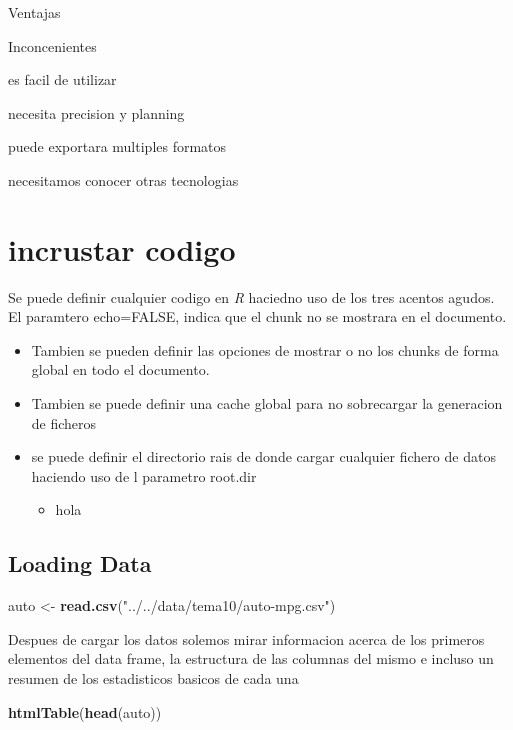 \documentclass[]{article}
\newenvironment{Shaded}{\begin{snugshade}}{\end{snugshade}}
\newcommand{\KeywordTok}[1]{\textcolor[rgb]{0.13,0.29,0.53}{\textbf{#1}}}
\newcommand{\StringTok}[1]{\textcolor[rgb]{0.31,0.60,0.02}{#1}}
\newcommand{\NormalTok}[1]{#1}
\providecommand{\tightlist}{%
  \setlength{\itemsep}{0pt}\setlength{\parskip}{0pt}}
\begin{document}
Ventajas

Inconcenientes

es facil de utilizar

necesita precision y planning

puede exportara multiples formatos

necesitamos conocer otras tecnologias

\section{incrustar codigo}\label{incrustar-codigo}

Se puede definir cualquier codigo en \emph{R} haciedno uso de los tres
acentos agudos. El paramtero echo=FALSE, indica que el chunk no se
mostrara en el documento.

\begin{itemize}
\tightlist
\item
  Tambien se pueden definir las opciones de mostrar o no los chunks de
  forma global en todo el documento.
\item
  Tambien se puede definir una cache global para no sobrecargar la
  generacion de ficheros
\item
  se puede definir el directorio rais de donde cargar cualquier fichero
  de datos haciendo uso de l parametro root.dir

  \begin{itemize}
  \tightlist
  \item
    hola
  \end{itemize}
\end{itemize}

\subsection{Loading Data}\label{loading-data}

\begin{Shaded}
\begin{Highlighting}[]
\NormalTok{auto <-}\StringTok{ }\KeywordTok{read.csv}\NormalTok{(}\StringTok{"../../data/tema10/auto-mpg.csv"}\NormalTok{)}
\end{Highlighting}
\end{Shaded}

Despues de cargar los datos solemos mirar informacion acerca de los
primeros elementos del data frame, la estructura de las columnas del
mismo e incluso un resumen de los estadisticos basicos de cada una

\begin{Shaded}
\begin{Highlighting}[]
\KeywordTok{htmlTable}\NormalTok{(}\KeywordTok{head}\NormalTok{(auto))}
\end{Highlighting}
\end{Shaded}
\end{document}
